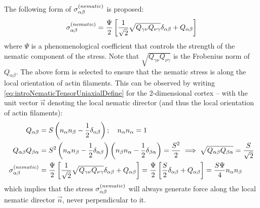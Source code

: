 The following form of $\sigma^{(nematic)}_{\alpha\beta}$ is proposed:
\begin{equation}\label{eq:nematicStressModelAC}
    \sigma^{(nematic)}_{\alpha\beta} = \frac{\Psi}{2}\left[\frac{1}{\sqrt{2}}\sqrt{Q_{\gamma\nu}Q_{\nu\gamma}}\delta_{\alpha\beta} + Q_{\alpha\beta}\right]
\end{equation}
where $\Psi$ is a phenomenological coefficient that controls the strength of the nematic component of the stress. Note that $\sqrt{Q_{\gamma\nu}Q_{\nu\gamma}}$ is the Frobenius norm of $Q_{\alpha\beta}$. The above form is selected to ensure that the nematic stress is along the local orientation of actin filaments. This can be observed by writing \autoref{eq:introNematicTensorUniaxialDefine} for the 2-dimensional cortex -- with the unit vector $\vec{n}$ denoting the local nematic director (and thus the local orientation of actin filaments):
\begin{align*}
    Q_{\alpha\beta} &= S\left(n_\alpha n_\beta - \frac{1}{2}\delta_{\alpha\beta}\right); \quad n_\alpha n_\alpha = 1\\
    Q_{\alpha\beta}Q_{\beta\alpha} &= S^2\left(n_\alpha n_\beta - \frac{1}{2}\delta_{\alpha\beta}\right)\left(n_\beta n_\alpha - \frac{1}{2}\delta_{\beta\alpha}\right) = \frac{S^2}{2} \implies \sqrt{Q_{\alpha\beta}Q_{\beta\alpha}} = \frac{S}{\sqrt{2}}\\
    \sigma^{(nematic)}_{\alpha\beta} &= \frac{\Psi}{2}\left[\frac{1}{\sqrt{2}}\sqrt{Q_{\gamma\nu}Q_{\nu\gamma}}\delta_{\alpha\beta} + Q_{\alpha\beta}\right] = \frac{\Psi}{2}\left[\frac{S}{2}\delta_{\alpha\beta} + Q_{\alpha\beta}\right] = \frac{S\Psi}{4}n_\alpha n_\beta
\end{align*}
which implies that the stress $\sigma^{(nematic)}_{\alpha\beta}$ will always generate force along the local nematic director $\vec{n}$, never perpendicular to it.

